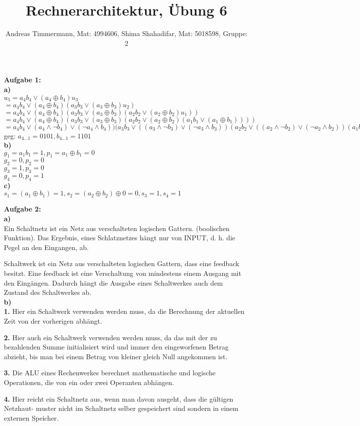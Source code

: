 \documentclass[a4paper]{scrartcl}
\title{Rechnerarchitektur, Übung 6}
\author{Andreas Timmermann, Mat: 4994606, Shima Shahadifar, Mat: 5018598, Gruppe: 2}
\begin{document}
	\maketitle
	\begin{flushleft}
		\textbf{Aufgabe 1:}\\
		\textbf{a)}\\
		$u_5=a_4 b_4 \vee (a_4\oplus b_4) u_3$\\
		$=a_4 b_4 \vee (a_4\oplus b_4) (a_3 b_3 \vee (a_3\oplus b_3) u_2)$
		$=a_4 b_4 \vee (a_4\oplus b_4) (a_3 b_3 \vee (a_3\oplus b_3) (a_2 b_2 \vee (a_2\oplus b_2) u_1))$
		$=a_4 b_4 \vee (a_4\oplus b_4) (a_3 b_3 \vee (a_3\oplus b_3) (a_2 b_2 \vee (a_2\oplus b_2) (a_1 b_1 \vee (a_1\oplus b_1))))$
		$=a_4 b_4 \vee (a_4\wedge \neg b_4)\vee (\neg a_4\wedge b_4)) (a_3 b_3 \vee ((a_3\wedge\neg b_3)\vee(\neg a_3\wedge b_3)) (a_2 b_2 \vee ((a_2\wedge\neg b_2)\vee(\neg a_2\wedge b_2)) (a_1 b_1 \vee ((a_1\wedge\neg b_1)\vee(\neg a_1\wedge b_1))))$\\[1em]
		geg: $a_{4\dots 1}=0101, b_{4\dots 1}=1101$\\
		\textbf{b)}\\
		$g_1=a_1 b_1 = 1, p_1=a_1\oplus b_1 = 0$\\
		$g_2=0, p_2=0$\\
		$g_3=1, p_3=0$\\
		$g_4=0, p_4=1$\\
		\textbf{c)}\\
		$s_1 = (a_1\oplus b_1) = 1,s_2 = (a_2\oplus b_2)\oplus 0 = 0,s_3 = 1,s_4 = 1$\\
	\end{flushleft}
	\begin{flushleft}
		\textbf{Aufgabe 2:}\\
\textbf{a)}\\

Ein Schaltnetz ist ein Netz aus verschalteten logischen Gattern. (boolischen Funktion). Das Ergebnis, eines Schlatznetzes hängt nur von INPUT, d. h. die Pegel an den Eingangen, ab.

Schaltwerk ist ein Netz aus verschalteten logischen Gattern, dass eine feedback besitzt. Eine feedback ist eine Verschaltung von mindestens einem Ausgang mit den Eingängen. Dadurch hängt die Ausgabe eines Schaltwerkes auch dem Zustand des Schaltwerkes ab.\\[1em]

\textbf{b)}\\

\textbf{1.} Hier ein Schaltwerk verwenden werden muss, da die Berechnung der aktuellen Zeit von der vorherigen abhängt.

\textbf{2.} Hier auch ein Schaltwerk verwenden werden muss, da das mit der zu bezahlenden Summe initialisiert wird und immer den eingeworfenen Betrag abzieht, bis man bei einem Betrag von kleiner gleich Null angekommen ist.

\textbf{3.} Die ALU eines Rechenwerkes berechnet mathematische und logische Operationen, die von ein oder zwei Operanten abhängen.

\textbf{4.} Hier reicht ein Schaltnetz aus, wenn man davon ausgeht, dass die gültigen Netzhaut- muster nicht im Schaltnetz selber gespeichert sind sondern in einem externen Speicher. 
	\end{flushleft}
\end{document}
